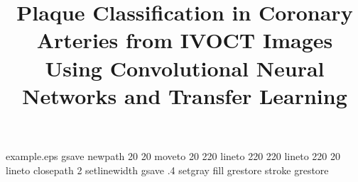 %
%
%
%
%
\begin{filecontents*}{example.eps}
gsave
newpath
  20 20 moveto
  20 220 lineto
  220 220 lineto
  220 20 lineto
closepath
2 setlinewidth
gsave
  .4 setgray fill
grestore
stroke
grestore
\end{filecontents*}
%
\RequirePackage{fix-cm}
%
\documentclass[onecolumn,10pt]{svjour3}
%
\smartqed  %
%
\usepackage{graphicx}
\usepackage{fixltx2e}
\usepackage[misc]{ifsym}
\usepackage{float}
\usepackage[multi-part-units=single]{siunitx}
\usepackage[font=small,labelfont=bf,tableposition=top]{caption}

%
%
%
%
%


\title{Plaque Classification in Coronary Arteries from IVOCT Images Using Convolutional Neural Networks and Transfer Learning}



